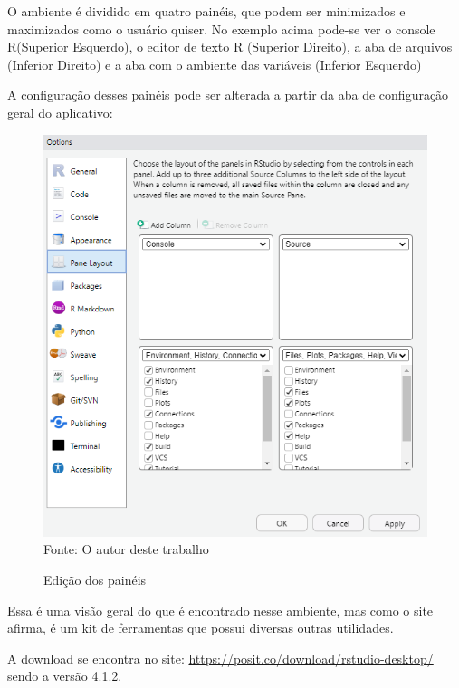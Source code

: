 	O ambiente é dividido em quatro painéis, que podem ser minimizados e maximizados como o usuário quiser. No exemplo acima pode-se ver o console R(Superior Esquerdo), o editor de texto R (Superior Direito), a aba de arquivos (Inferior Direito) e a aba com o ambiente das variáveis (Inferior Esquerdo)\par
	A configuração desses painéis pode ser alterada a partir da aba de configuração geral do aplicativo:\begin{figure}[H]
		\centering
		\caption{Edição dos painéis}
		\includegraphics[width=1.0\linewidth]{Prints/screenshot029}
		\label{fig:screenshot029}
		{\tiny \sf Fonte: O autor deste trabalho }
	\end{figure}\par 

		Essa é uma visão geral do que é encontrado nesse ambiente, mas como o site afirma, é um kit de ferramentas que possui diversas outras utilidades.\par
		A download se encontra no site: \url{https://posit.co/download/rstudio-desktop/} sendo a versão 4.1.2.
	
	
    